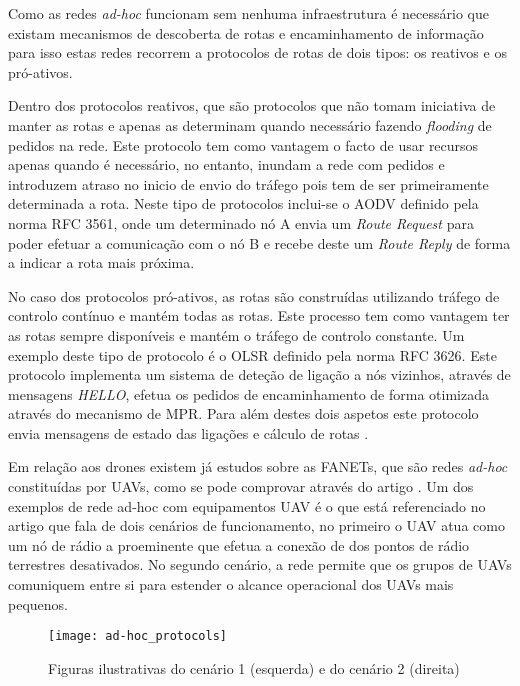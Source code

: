 Como as redes \textit{ad-hoc} funcionam sem nenhuma infraestrutura é necessário que existam mecanismos de descoberta de rotas e encaminhamento de informação para isso estas redes recorrem a protocolos de rotas de dois tipos: os reativos e os pró-ativos.

Dentro dos protocolos reativos, que são protocolos que não tomam iniciativa de manter as rotas e apenas as determinam quando necessário fazendo \textit{flooding} de pedidos na rede. Este protocolo tem como vantagem o facto de usar recursos apenas quando é necessário, no entanto, inundam a rede com pedidos e introduzem atraso no inicio de envio do tráfego pois tem de ser primeiramente determinada a rota. Neste tipo de protocolos inclui-se o AODV definido pela norma RFC 3561, onde um determinado nó A envia um \textit{Route Request} para poder efetuar a comunicação com o nó B e recebe deste um \textit{Route Reply} de forma a indicar a rota mais próxima.

No caso dos protocolos pró-ativos, as rotas são construídas utilizando tráfego de controlo contínuo e mantém todas as rotas. Este processo tem como vantagem ter as rotas sempre disponíveis e mantém o tráfego de controlo constante. Um exemplo deste tipo de protocolo é o OLSR definido pela norma RFC 3626. Este protocolo implementa um sistema de deteção de ligação a nós vizinhos, através de mensagens \textit{HELLO}, efetua os pedidos de encaminhamento de forma otimizada através do mecanismo de MPR. Para além destes dois aspetos este protocolo envia mensagens de estado das ligações e cálculo de rotas \cite{Ricardoa}.

Em relação aos drones existem já estudos sobre as FANETs, que são redes \textit{ad-hoc} constituídas por UAVs, como se pode comprovar através do artigo \cite{Bekmezci2013a}. Um dos exemplos de rede ad-hoc com equipamentos UAV é o que está referenciado no artigo \cite{Brown2004} que fala de dois cenários de funcionamento, no primeiro o UAV atua como um nó de rádio  a proeminente que efetua a conexão de dos pontos de rádio terrestres desativados. No segundo cenário, a rede permite que os grupos de UAVs comuniquem entre si para estender o alcance operacional dos UAVs mais pequenos.

\begin{figure}[H]
\centering
\texttt{[image: ad-hoc\_protocols]}
\caption{Figuras ilustrativas do cenário 1 (esquerda) e do cenário 2 (direita)  \label{fig:ad-hoc_protocols}}
\cite{Ricardoa}
\end{figure}

